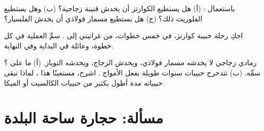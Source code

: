 \begin{exercise}[$\star\star$]\label{exo:g6:rocks-and-minerals:10}
باستعمال : (أ) هل يستطيع الكوارتز أن يخدش قنينة زجاجية؟ (ب) وهل
يستطيع الفلوريت ذلك؟ (ج) هل يستطيع مسمار فولاذي أن يخدش الفلسبار؟
\end{exercise}

\begin{exercise}[$\star\star\star$]\label{exo:g6:rocks-and-minerals:11}
احكِ رحلة حبيبة كوارتز، في خمس خطوات، من  غرانيتي إلى .
سمِّ العملية في كل خطوة، وعائلة  في البداية
وفي النهاية.
\end{exercise}

\begin{exercise}[$\star\star\star$]\label{exo:g6:rocks-and-minerals:12}
 رمادي زجاجي لا يخدشه مسمار فولاذي، ويخدش الزجاج، ويخدشه
التوباز. (أ) ما  على ؟ سمِّه. (ب) تتدحرج حبيبات 
سنوات طويلة بفعل الأمواج . اشرح، مستعينًا  هذا ،
لماذا تبقى حبيباته مدة أطول بكثير من حبيبات الكالسيت أو
الميكا.
\end{exercise}

\section{مسألة: حجارة ساحة البلدة}

